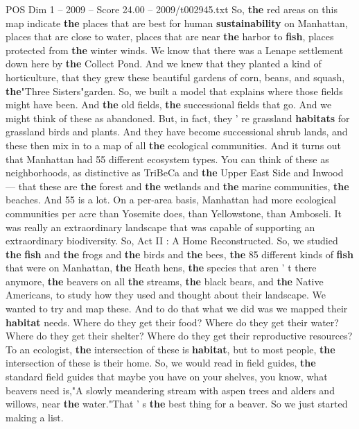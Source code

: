 \begin{textsample}{POS Dim 1 – 2009 – Score 24.00 – 2009/t002945.txt}
So, \textbf{the} red areas on this map indicate \textbf{the} places that are best for human \textbf{sustainability} on Manhattan, places that are close to water, places that are near \textbf{the} harbor to \textbf{fish}, places protected from \textbf{the} winter winds.
We know that there was a Lenape settlement down here by \textbf{the} Collect Pond.
And we knew that they planted a kind of horticulture, that they grew these beautiful gardens of corn, beans, and squash, \textbf{the}"Three Sisters"garden.
So, we built a model that explains where those fields might have been.
And \textbf{the} old fields, \textbf{the} successional fields that go.
And we might think of these as abandoned.
But, in fact, they ' re grassland \textbf{habitats} for grassland birds and plants.
And they have become successional shrub lands, and these then mix in to a map of all \textbf{the} ecological communities.
And it turns out that Manhattan had 55 different ecosystem types.
You can think of these as neighborhoods, as distinctive as TriBeCa and \textbf{the} Upper East Side and Inwood — that these are \textbf{the} forest and \textbf{the} wetlands and \textbf{the} marine communities, \textbf{the} beaches.
And 55 is a lot.
On a per-area basis, Manhattan had more ecological communities per acre than Yosemite does, than Yellowstone, than Amboseli.
It was really an extraordinary landscape that was capable of supporting an extraordinary biodiversity.
So, Act II : A Home Reconstructed.
So, we studied \textbf{the} \textbf{fish} and \textbf{the} frogs and \textbf{the} birds and \textbf{the} bees, \textbf{the} 85 different kinds of \textbf{fish} that were on Manhattan, \textbf{the} Heath hens, \textbf{the} species that aren ' t there anymore, \textbf{the} beavers on all \textbf{the} streams, \textbf{the} black bears, and \textbf{the} Native Americans, to study how they used and thought about their landscape.
We wanted to try and map these.
And to do that what we did was we mapped their \textbf{habitat} needs.
Where do they get their food?
Where do they get their water?
Where do they get their shelter?
Where do they get their reproductive resources?
To an ecologist, \textbf{the} intersection of these is \textbf{habitat}, but to most people, \textbf{the} intersection of these is their home.
So, we would read in field guides, \textbf{the} standard field guides that maybe you have on your shelves, you know, what beavers need is,"A slowly meandering stream with aspen trees and alders and willows, near \textbf{the} water."That ' s \textbf{the} best thing for a beaver.
So we just started making a list.

\end{textsample}

